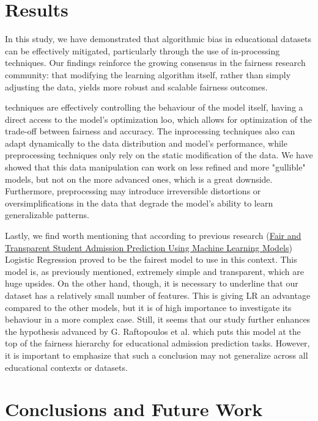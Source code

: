 \documentclass{article}
\begin{document}
\section{Results}
In this study, we have demonstrated that algorithmic bias in educational datasets can be effectively mitigated, particularly through the use of in-processing techniques.
Our findings reinforce the growing consensus in the fairness research community: that modifying the learning algorithm itself, rather than simply adjusting the data, yields more robust and scalable fairness outcomes. { techniques are effectively controlling the behaviour of the model itself, having a direct access to the model's optimization loo, which allows for optimization of the trade-off between fairness and accuracy. The inprocessing techniques also can adapt dynamically to the data distribution and model's performance, while preprocessing techniques only rely on the static modification of the data. We have showed that this data manipulation can work on less refined and more "gullible" models, but not on the more advanced ones, which is a great downside. Furthermore, preprocessing may introduce irreversible distortions or oversimplifications in the data that degrade the model’s ability to learn generalizable patterns.

Lastly, we find worth mentioning that according to previous research (\href{https://www.researchgate.net/publication/387044808_Fair_and_Transparent_Student_Admission_Prediction_Using_Machine_Learning_Models#read}{Fair and Transparent Student Admission Prediction Using Machine Learning Models}) Logistic Regression proved to be the fairest model to use in this context. This model is, as previously mentioned, extremely simple and transparent, which are huge upsides. On the other hand, though, it is necessary to underline that our dataset has a relatively small number of features. This is giving LR an advantage compared to the other models, but it is of high importance to investigate its behaviour in a more complex case. Still, it seems that our study further enhances the hypothesis advanced by G. Raftopoulos et al. which puts this model at the top of the fairness hierarchy for educational admission prediction tasks. However, it is important to emphasize that such a conclusion may not generalize across all educational contexts or datasets. 


\section{Conclusions and Future Work}

}
\end{document}
